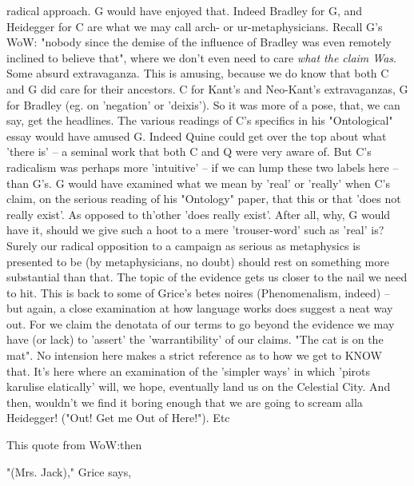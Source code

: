 \documentclass[10pt,titlepage]{book}
\begin{document}
radical approach. G would have enjoyed that. Indeed Bradley for G, and  
Heidegger for C are what we may call arch- or ur-metaphysicians. Recall G's 
WoW:  "nobody since the demise of the influence of Bradley was even remotely 
inclined  to believe that", where we don't even need to care {\it what the claim 
Was}. Some  absurd extravaganza. This is amusing, because we do know that 
both C and G did  care for their ancestors. C for Kant's and Neo-Kant's 
extravaganzas, G for  Bradley (eg. on 'negation' or 'deixis'). So it was more of a 
pose, that, we can  say, get the headlines. The various readings of C's 
specifics in his  "Ontological" essay would have amused G. Indeed Quine could 
get over the top  about what 'there is' -- a seminal work that both C and Q 
were very aware of.  But C's radicalism was perhaps more 'intuitive' -- if we 
can lump these two  labels here -- than G's. G would have examined what we 
mean by 'real' or  'really' when C's claim, on the serious reading of his 
"Ontology" paper, that  this or that 'does not really exist'. As opposed to 
th'other 'does really  exist'. After all, why, G would have it, should we give 
such a hoot to a mere  'trouser-word' such as 'real' is? Surely our radical 
opposition to a campaign as  serious as metaphysics is presented to be (by 
metaphysicians, no doubt) should  rest on something more substantial than 
that. The topic of the evidence gets us  closer to the nail we need to hit. 
This is back to some of Grice's betes noires  (Phenomenalism, indeed) -- but 
again, a close examination at how language works  does suggest a neat way out. 
For we claim the denotata of our terms to go beyond  the evidence we may 
have (or lack) to 'assert' the 'warrantibility' of our  claims. "The cat is on 
the mat". No intension here makes a strict reference as  to how we get to 
KNOW that. It's here where an examination of the 'simpler ways'  in which 
'pirots karulise elatically' will, we hope, eventually land us on the  
Celestial City. And then, wouldn't we find it boring enough that we are going to  
scream alla Heidegger! ("Out! Get me Out of Here!"). Etc

This quote from WoW:then
 
 
"(Mrs. Jack)," Grice says,
\end{document}
